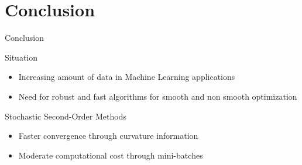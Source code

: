 \documentclass[11pt]{beamer}
\begin{document}
	\section{Conclusion}
	\begin{frame}{Conclusion}
		\begin{block}{Situation}
			\begin{itemize}
				\item Increasing amount of data in Machine Learning applications
				\item Need for robust and fast algorithms for smooth and non smooth optimization
			\end{itemize}
		\end{block}
		\begin{block}{Stochastic Second-Order Methods}
			\begin{itemize}
				\item Faster convergence through curvature information
				\item Moderate computational cost through mini-batches
			\end{itemize}
		\end{block}
	\end{frame}
	
	
\end{document}
